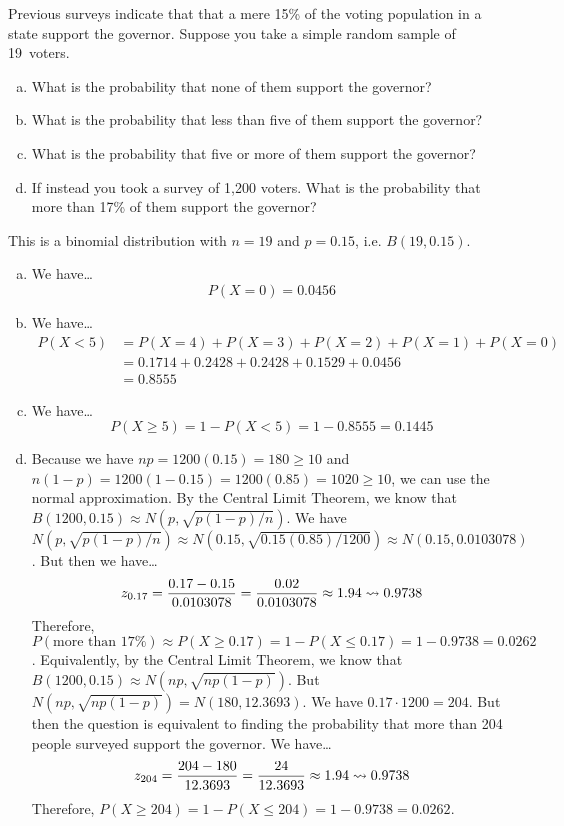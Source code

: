 \documentclass[11pt,letterpaper]{article}
\begin{document}

 Previous surveys indicate that that a mere 15\% of the voting population in a state support the governor. Suppose you take a simple random sample of 19~voters.
	\begin{enumerate}[(a)]
	\item What is the probability that none of them support the governor?
	\item What is the probability that less than five of them support the governor?
	\item What is the probability that five or more of them support the governor?
	\item If instead you took a survey of 1,200 voters. What is the probability that more than 17\% of them support the governor?
	\end{enumerate} \pspace

\sol This is a binomial distribution with $n= 19$ and $p= 0.15$, i.e. $B(19, 0.15)$. 

\begin{enumerate}[(a)]
\item We have\dots
	\[
	P(X= 0)= 0.0456
	\] \pspace

\item We have\dots
	\[
	\begin{aligned}
	P(X < 5)&= P(X= 4) + P(X= 3) + P(X= 2) + P(X= 1)+ P(X= 0) \\[0.3cm]
	&= 0.1714 + 0.2428 + 0.2428 + 0.1529 + 0.0456 \\[0.3cm]
	&= 0.8555
	\end{aligned}
	\] \pspace

\item We have\dots
	\[
	P(X \geq 5)= 1 - P(X < 5)= 1 - 0.8555= 0.1445
	\] \pspace

\item Because we have $np= 1200(0.15)= 180 \geq 10$ and $n(1 - p)= 1200(1 - 0.15)= 1200(0.85)= 1020 \geq 10$, we can use the normal approximation. By the Central Limit Theorem, we know that $B(1200, 0.15) \approx N(p, \sqrt{p(1 - p)/n})$. We have $N(p, \sqrt{p(1 - p)/n}) \approx N(0.15, \sqrt{0.15(0.85)/1200}) \approx N(0.15, 0.0103078)$. But then we have\dots
	\[
	z_{0.17}= \dfrac{0.17 - 0.15}{0.0103078}= \dfrac{0.02}{0.0103078} \approx 1.94 \rightsquigarrow 0.9738
	\]
Therefore, $P(\text{more than 17\%}) \approx P(X \geq 0.17)= 1 - P(X \leq 0.17)= 1 - 0.9738= 0.0262$. Equivalently, by the Central Limit Theorem, we know that $B(1200, 0.15) \approx N(np, \sqrt{np(1 - p)})$. But $N(np, \sqrt{np(1 - p)})= N(180, 12.3693)$. We have $0.17 \cdot 1200= 204$. But then the question is equivalent to finding the probability that more than 204 people surveyed support the governor. We have\dots
	\[
	z_{204}= \dfrac{204 - 180}{12.3693}= \dfrac{24}{12.3693} \approx 1.94 \rightsquigarrow 0.9738
	\]
Therefore, $P(X \geq 204)= 1 - P(X \leq 204)= 1 - 0.9738= 0.0262$. 
\end{enumerate}
\end{document}
